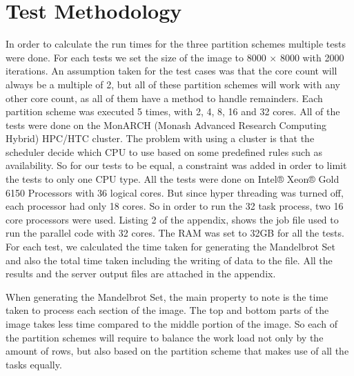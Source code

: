 \documentclass[conference]{IEEEtran}
\begin{document}
	\section{Test Methodology}
	 \label{TEST}
	In order to calculate the run times for the three partition schemes multiple tests were done. For each tests we set the size of the image to 8000 $\times$ 8000 with 2000 iterations. An assumption taken for the test cases was that the core count will always be a multiple of 2, but all of these partition schemes will work with any other core count, as all of them have a method to handle remainders. Each partition scheme was executed 5 times, with 2, 4, 8, 16 and 32 cores. \newline
	All of the tests were done on the MonARCH (Monash Advanced Research Computing Hybrid) HPC/HTC cluster. The problem with using a cluster is that the scheduler decide which CPU to use based on some predefined rules such as availability. So for our tests to be equal, a constraint was added in order to limit the tests to only one CPU type. All the tests were done on Intel® Xeon® Gold 6150 Processors with 36 logical cores. But since hyper threading was turned off, each processor had only 18 cores. So in order to run the 32 task process, two 16 core processors were used. Listing 2 of the appendix, shows the job file used to run the parallel code with 32 cores. The RAM was set to 32GB for all the tests. \newline
	For each test, we calculated the time taken for generating the Mandelbrot Set and also the total time taken including the writing of data to the file. All the results and the server output files are attached in the appendix. 
	
	When generating the Mandelbrot Set, the main property to note is the time taken to process each section of the image. The top and bottom parts of the image takes less time compared to the middle portion of the image. So each of the partition schemes will require to balance the work load not only by the amount of rows, but also based on the partition scheme that makes use of all the tasks equally.
\end{document}
